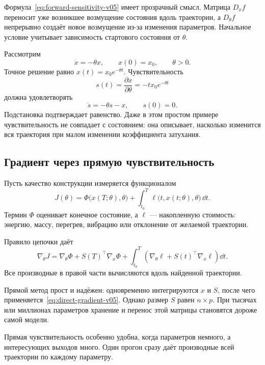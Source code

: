 Формула~\eqref{eq:forward-sensitivity-v05} имеет прозрачный смысл. Матрица $D_xf$ переносит уже возникшее возмущение состояния вдоль траектории, а $D_\theta f$ непрерывно создаёт новое возмущение из-за изменения параметров. Начальное условие учитывает зависимость стартового состояния от $\theta$.

\begin{example}
Рассмотрим
\[
\dot x=-\theta x,
\qquad
x(0)=x_0,
\qquad
\theta>0.
\]
Точное решение равно $x(t)=x_0e^{-\theta t}$. Чувствительность
\[
s(t)=\frac{\partial x}{\partial\theta}=-tx_0e^{-\theta t}
\]
должна удовлетворять
\[
\dot s=-\theta s-x,
\qquad
s(0)=0.
\]
Подстановка подтверждает равенство. Даже в этом простом примере чувствительность не совпадает с состоянием: она описывает, насколько изменится вся траектория при малом изменении коэффициента затухания.
\end{example}

\subsection{Градиент через прямую чувствительность}

Пусть качество конструкции измеряется функционалом
\begin{equation}
\label{eq:trajectory-objective-v05}
J(\theta)
=
\Phi\bigl(x(T;\theta),\theta\bigr)
+
\int_{t_0}^{T}
\ell\bigl(t,x(t;\theta),\theta\bigr)\,\dd t.
\end{equation}
Термин $\Phi$ оценивает конечное состояние, а $\ell$ --- накопленную стоимость: энергию, массу, перегрев, вибрацию или отклонение от желаемой траектории.

Правило цепочки даёт
\begin{equation}
\label{eq:direct-gradient-v05}
\nabla_\theta J
=
\nabla_\theta\Phi
+S(T)^\top\nabla_x\Phi
+
\int_{t_0}^{T}
\left(
\nabla_\theta\ell
+S(t)^\top\nabla_x\ell
\right)\dd t.
\end{equation}
Все производные в правой части вычисляются вдоль найденной траектории.

Прямой метод прост и надёжен: одновременно интегрируются $x$ и $S$, после чего применяется~\eqref{eq:direct-gradient-v05}. Однако размер $S$ равен $n\times p$. При тысячах или миллионах параметров хранение и перенос этой матрицы становятся дороже самой модели.

\begin{principle}
\label{pr:when-forward-sensitivity-v05}
Прямая чувствительность особенно удобна, когда параметров немного, а интересующих выходов много. Один прогон сразу даёт производные всей траектории по каждому параметру.
\end{principle}

